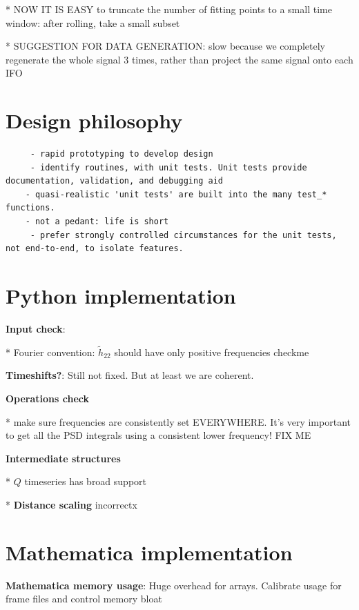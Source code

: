 \documentclass[twocolumn,prd,nofootinbib]{revtex4}
\newcommand\editremark[1]{{\color{red} #1}}
\begin{document}
* NOW IT IS EASY to truncate the number of fitting points to a small time window: after rolling, take a small subset

* SUGGESTION FOR DATA GENERATION: slow because we completely regenerate the whole signal 3 times, rather than
  project the same signal onto each IFO

\section{Design philosophy}

\begin{verbatim}
     - rapid prototyping to develop design
     - identify routines, with unit tests. Unit tests provide documentation, validation, and debugging aid
	- quasi-realistic 'unit tests' are built into the many test_* functions.
	- not a pedant: life is short
     - prefer strongly controlled circumstances for the unit tests, not end-to-end, to isolate features. 
\end{verbatim}

\section{Python implementation}

\noindent \textbf{Input check}: 

* Fourier convention: $\tilde{h}_{22}$ should have only positive frequencies \editremark{checkme}

\noindent \textbf{Timeshifts?}: Still not fixed. But at least we are coherent.


\noindent \textbf{Operations check}

* make sure frequencies are consistently set EVERYWHERE.  It's very important to get all the PSD integrals using a
consistent lower frequency! \editremark{FIX ME}

\noindent \textbf{Intermediate structures}



* $Q$ timeseries has broad support

* \textbf{Distance scaling} incorrectx

\section{Mathematica implementation}

\noindent \textbf{Mathematica memory usage}: Huge overhead for arrays.  Calibrate usage for frame files and control
memory bloat
\end{document}
